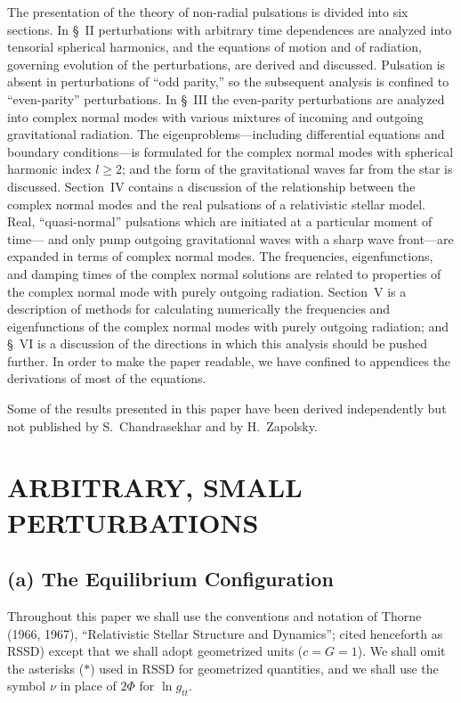 \documentclass[12pt]{article}
\begin{document}
The presentation of the theory of non-radial pulsations is divided into six sections.
In \S~II perturbations with arbitrary time dependences are analyzed into tensorial
spherical harmonics, and the equations of motion and of radiation, governing evolution of
the perturbations, are derived and discussed. Pulsation is absent in perturbations of
``odd parity,'' so the subsequent analysis is confined to ``even-parity'' perturbations. In
\S~III the even-parity perturbations are analyzed into complex normal modes with various
mixtures of incoming and outgoing gravitational radiation. The eigenproblems---including
differential equations and boundary conditions---is formulated for the complex
normal modes with spherical harmonic index $l \geq 2$; and the form of the gravitational
waves far from the star is discussed. Section~IV contains a discussion of the relationship
between the complex normal modes and the real pulsations of a relativistic stellar model.
Real, ``quasi-normal'' pulsations which are initiated at a particular moment of time---
and only pump outgoing gravitational waves with a sharp wave front---are expanded in
terms of complex normal modes. The frequencies, eigenfunctions, and damping times of
the complex normal solutions are related to properties of the complex normal mode with
purely outgoing radiation. Section~V is a description of methods for calculating numerically
the frequencies and eigenfunctions of the complex normal modes with purely
outgoing radiation; and \S~VI is a discussion of the directions in which this analysis
should be pushed further. In order to make the paper readable, we have confined to
appendices the derivations of most of the equations.

Some of the results presented in this paper have been derived independently but not
published by S.\ Chandrasekhar and by H.\ Zapolsky.

\section{ARBITRARY, SMALL PERTURBATIONS}

\subsection*{(a) The Equilibrium Configuration}

Throughout this paper we shall use the conventions and notation of Thorne (1966,
1967), ``Relativistic Stellar Structure and Dynamics''; cited henceforth as RSSD) except
that we shall adopt geometrized units ($c = G = 1$). We shall omit the
asterisks ($*$) used in RSSD for geometrized quantities, and we shall use the symbol $\nu$ in
place of $2\Phi$ for $\ln g_{tt}$.
\end{document}
